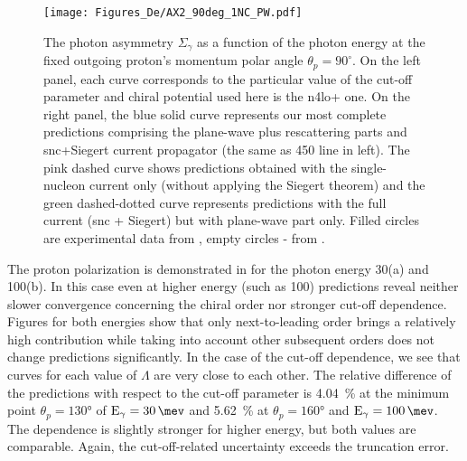      
    \begin{figure}[h]
        \begin{center}
        \texttt{[image: Figures\_De/AX2\_90deg\_1NC\_PW.pdf]}
        \end{center}
        \caption{The photon asymmetry $\Sigma_\gamma$ 
        as a function of the photon energy  
        at the fixed outgoing proton's momentum polar angle $\theta_p=90^\circ$.
        On the left panel, each curve corresponds to the particular value of the cut-off parameter
        and chiral potential used here is the \gls{n4lo+} one.
        On the right panel, the blue solid curve represents our most complete predictions
        comprising the plane-wave plus rescattering parts and \gls{snc}+Siegert current propagator 
        (the same as \SI{450}{\mev} line in left).
        The pink dashed curve shows predictions obtained with
        the single-nucleon current only (without applying the Siegert theorem) and the green dashed-dotted
        curve represents predictions with the full current (\gls{snc} + Siegert) but with plane-wave part only.
        Filled circles are experimental data from \cite{delbianco_1981},
        empty circles - from \cite{depascale_asymmetry}.}
        \label{asymmetry_90deg}
    \end{figure}


    The proton polarization is demonstrated in  for the 
    photon energy \SI{30}{\mev}(a) and \SI{100}{\mev}(b).
    In this case even at higher energy
    (such as \SI{100}{\mev}) predictions reveal neither slower convergence concerning the chiral order nor stronger cut-off dependence. Figures for both energies show
    that only next-to-leading order brings a relatively high contribution
    while taking into account other subsequent orders does not change predictions
    significantly. In the case of the cut-off dependence, we see that curves for each
    value of $\Lambda$ are very close to each other. 
    The relative difference of the predictions with respect to the cut-off parameter
    is \SI{4.04}{\percent} at the minimum point $\theta_p=\ang{130}$ of $\text{E}_\gamma = \SI{30}{\mev}$
    and \SI{5.62}{\percent} at $\theta_p=\ang{160}$ and $\text{E}_\gamma = \SI{100}{\mev}$.
    The dependence is slightly stronger for higher energy, but both values are comparable.
    Again, the cut-off-related uncertainty exceeds the truncation error.

